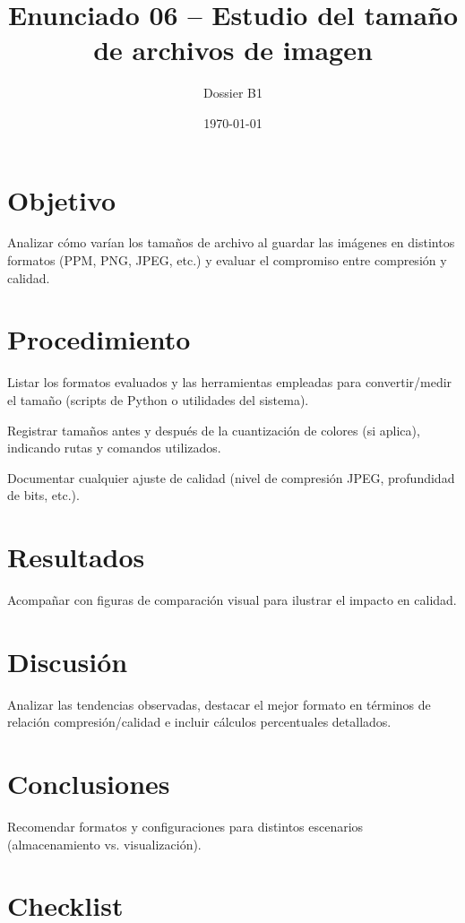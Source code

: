 \documentclass[12pt]{article}
\title{Enunciado 06 -- Estudio del tamaño de archivos de imagen}
\author{Dossier B1}
\date{\today}
\begin{document}
\maketitle
\section{Objetivo}
Analizar cómo varían los tamaños de archivo al guardar las imágenes en distintos formatos (PPM, PNG, JPEG, etc.) y evaluar el compromiso entre compresión y calidad.

\section{Procedimiento}
\begin{pasoapaso}
  \item Listar los formatos evaluados y las herramientas empleadas para convertir/medir el tamaño (scripts de Python o utilidades del sistema).
  \item Registrar tamaños antes y después de la cuantización de colores (si aplica), indicando rutas y comandos utilizados.
  \item Documentar cualquier ajuste de calidad (nivel de compresión JPEG, profundidad de bits, etc.).
\end{pasoapaso}

\section{Resultados}
Acompañar con figuras de comparación visual para ilustrar el impacto en calidad.

\section{Discusión}
Analizar las tendencias observadas, destacar el mejor formato en términos de relación compresión/calidad e incluir cálculos percentuales detallados.

\section{Conclusiones}
Recomendar formatos y configuraciones para distintos escenarios (almacenamiento vs. visualización).

\section*{Checklist}
\ChecklistBase
\end{document}
